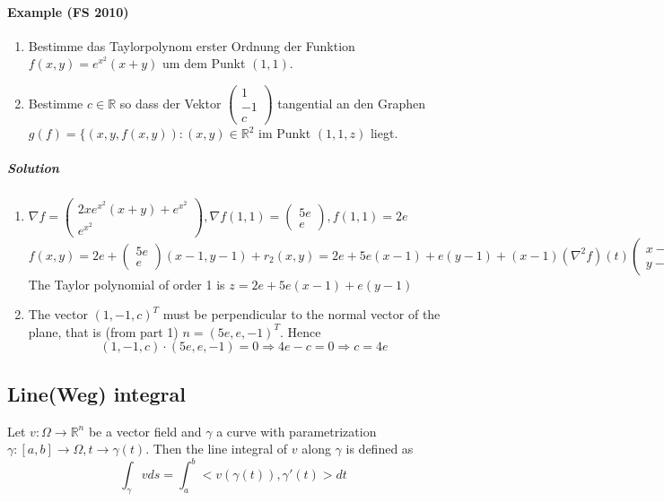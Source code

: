 \documentclass[11pt,a4paper]{book}
\begin{document}
\paragraph*{Example (FS 2010)}
\begin{enumerate}
\item Bestimme das Taylorpolynom erster Ordnung der Funktion $f(x,y)=e^{x^2}(x+y)$ um dem Punkt $(1,1)$.
\item Bestimme $c \in \mathbb{R}$ so dass der Vektor $\begin{pmatrix}
1 \\ 
-1 \\ 
c
\end{pmatrix} $ tangential an den Graphen $g(f)=\{(x,y,f(x,y)):(x,y)\in \mathbb{R}^2$ im Punkt $(1,1,z)$ liegt.
\end{enumerate}
\subparagraph*{Solution}
\begin{enumerate}
\item
$\nabla f=\begin{pmatrix}
2xe^{x^2}(x+y)+e^{x^2} \\ 
e^{x^2}
\end{pmatrix}, \nabla f(1,1)=\begin{pmatrix} 5e \\ e \end{pmatrix}, f(1,1)=2e$
$$f(x,y)=2e+\begin{pmatrix} 5e \\ e \end{pmatrix}(x-1,y-1)+r_2(x,y)=2e+5e(x-1)+e(y-1)+(x-1)(\nabla^2 f)(t)\begin{pmatrix} x-1 \\ y-1 \end{pmatrix}$$
The Taylor polynomial of order 1 is $z=2e+5e(x-1)+e(y-1)$
\item The vector $(1, -1, c)^T$ must be perpendicular to the normal vector of the plane, that is (from part 1) $n=(5e, e, -1)^T$. Hence
$$(1, -1, c) \cdot (5e, e, -1)=0 \Rightarrow 4e-c=0 \Rightarrow c=4e$$
\end{enumerate}

\subsection{Line(Weg)  integral}
Let $v:\Omega \rightarrow \mathbb{R}^n$ be a vector field and $\gamma$ a curve with parametrization $\gamma: [a,b]\rightarrow \Omega, t\rightarrow \gamma(t)$. Then the line integral of $v$ along $\gamma$ is defined as 
$$\int_{\gamma} v ds= \int_a^b <v(\gamma(t)),\gamma '(t)> dt$$
\end{document}
